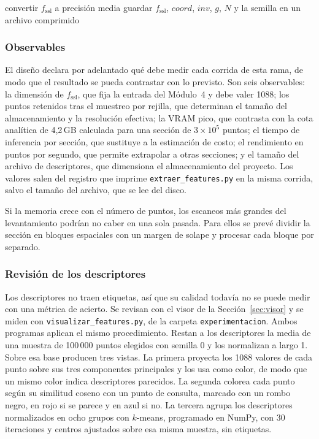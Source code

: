 \begin{algorithm}[H]
\small
\caption{Paso 5 del Módulo~3, escritura.}
convertir $f_{\mathrm{ssl}}$ a precisión media\;
guardar $f_{\mathrm{ssl}}$, $\mathit{coord}$, $\mathit{inv}$, $g$, $N$ y la semilla en un archivo comprimido\;
\end{algorithm}

\FloatBarrier
\subsubsection*{Observables}
\label{sec:observables}

El diseño declara por adelantado qué debe medir cada corrida de esta rama, de
modo que el resultado se pueda contrastar con lo previsto. Son seis observables:
la dimensión de $f_{\mathrm{ssl}}$, que fija la entrada del Módulo~4 y debe
valer 1088; los puntos retenidos tras el muestreo por rejilla, que determinan el
tamaño del almacenamiento y la resolución efectiva; la VRAM pico, que contrasta
con la cota analítica de 4{,}2\,GB calculada para una sección de
$3\times10^{5}$ puntos; el tiempo de inferencia por sección, que sustituye a la
estimación de costo; el rendimiento en puntos por segundo, que permite
extrapolar a otras secciones; y el tamaño del archivo de descriptores, que
dimensiona el almacenamiento del proyecto. Los valores salen del registro que
imprime \texttt{extraer\_features.py} en la misma corrida, salvo el tamaño del
archivo, que se lee del disco.

Si la memoria crece con el número de puntos, los escaneos más grandes del
levantamiento podrían no caber en una sola pasada. Para ellos se prevé dividir
la sección en bloques espaciales con un margen de solape y procesar cada bloque
por separado.

\subsubsection*{Revisión de los descriptores}
\label{sec:revision-descriptores}

Los descriptores no traen etiquetas, así que su calidad todavía no se puede
medir con una métrica de acierto. Se revisan con el visor
de la Sección~\ref{sec:visor} y se miden con \texttt{visualizar\_features.py}, de la
carpeta \texttt{experimentacion}. Ambos programas aplican el mismo
procedimiento. Restan a los descriptores la media de una muestra de 100\,000
puntos elegidos con semilla 0 y los normalizan a largo 1. Sobre esa base
producen tres vistas. La primera proyecta los 1088 valores de cada punto sobre
sus tres componentes principales y los usa como color, de modo que un mismo
color indica descriptores parecidos. La segunda colorea cada punto según su
similitud coseno con un punto de consulta, marcado con un rombo negro, en rojo
si se parece y en azul si no. La tercera agrupa los descriptores normalizados en
ocho grupos con $k$-means, programado en NumPy, con 30 iteraciones y centros
ajustados sobre esa misma muestra, sin etiquetas.

